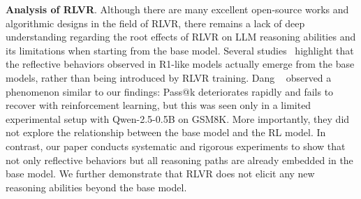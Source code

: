 \textbf{Analysis of RLVR}. Although there are many excellent open-source works and algorithmic designs in the field of RLVR, there remains a lack of deep understanding regarding the root effects of RLVR on LLM reasoning abilities and its limitations when starting from the base model. 
Several studies~\cite{liu2025there, zhao2025echo, shah2025rethinking} highlight that the reflective behaviors observed in R1-like models actually emerge from the base models, rather than being introduced by RLVR training.
Dang \etal~\cite{dang2025assessing} observed a phenomenon similar to our findings: Pass@k deteriorates rapidly and fails to recover with reinforcement learning, but this was seen only in a limited experimental setup with Qwen-2.5-0.5B on GSM8K. More importantly, they did not explore the relationship between the base model and the RL model. In contrast, our paper conducts systematic and rigorous experiments to show that not only reflective behaviors but all reasoning paths are already embedded in the base model. We further demonstrate that RLVR does not elicit any new reasoning abilities beyond the base model.


